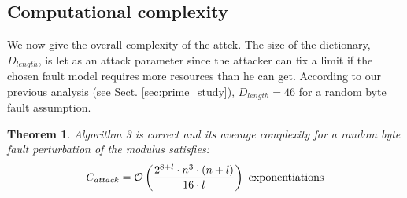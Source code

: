 \documentclass{article}
\newtheorem{theorem}{Theorem}
\begin{document}
\subsection{Computational complexity}


We now give the overall complexity of the attck. 
The size of the dictionary, $D_{length}$, is let as an attack
parameter since the
attacker can fix a limit if the chosen fault model requires more
resources than he can get. 
According to our previous analysis (see Sect. \ref{sec:prime_study}),
$D_{length} = 46$ for a random byte fault assumption. 

\begin{theorem}Algorithm 3 is correct and its average complexity for a random byte fault perturbation of the modulus satisfies:
 $$ {C}_{attack} = {\cal O}\left(\dfrac{2^{8+l} \cdot n^{3} \cdot (n+l)}{16 \cdot l}\right)
\mbox{ exponentiations}
$$\end{theorem}
\end{document}
